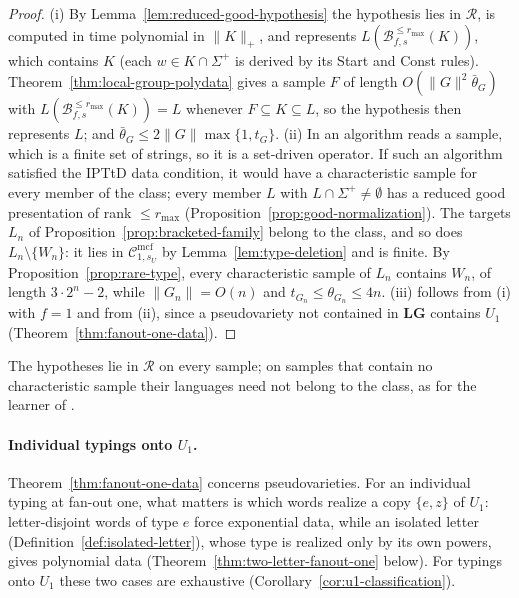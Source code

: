 \documentclass[11pt]{article}
\numberwithin{equation}{section}
\theoremstyle{plain}
\theoremstyle{definition}
\theoremstyle{remark}
\newcommand{\Cmcf}[2]{\mathcal{C}^{\mathrm{mcf}}_{#1,#2}}
\theoremstyle{plain}
\begin{document}
\begin{proof}
(i) By Lemma~\ref{lem:reduced-good-hypothesis} the hypothesis lies in
$\mathcal R$, is computed in time polynomial in $\|K\|_+$, and represents
$L(\mathcal B^{\le r_{\max}}_{f,s}(K))$, which contains $K$ (each $w\in K\cap\Sigma^+$
is derived by its Start and Const rules).
Theorem~\ref{thm:local-group-polydata} gives a sample $F$ of length
$O(\|G\|^2\bar\theta_G)$ with $L(\mathcal B^{\le r_{\max}}_{f,s}(K))=L$ whenever
$F\subseteq K\subseteq L$, so the hypothesis then represents $L$; and
$\bar\theta_G\le2\|G\|\max\{1,t_G\}$.
(ii) In \cite[Definition~2.12]{EyraudHeinzYoshinaka2016} an algorithm reads a
sample, which is a finite set of strings, so it is a set-driven operator.  If
such an algorithm satisfied the IPTtD data condition, it would have a
characteristic sample for every member of the class; every member $L$
with $L\cap\Sigma^+\ne\emptyset$ has a reduced good
presentation of rank $\le r_{\max}$ (Proposition~\ref{prop:good-normalization}).
The targets $L_n$ of Proposition~\ref{prop:bracketed-family} belong to the class,
and so does $L_n\setminus\{W_n\}$: it lies in $\Cmcf{1}{s_U}$ by
Lemma~\ref{lem:type-deletion} and is finite.  By
Proposition~\ref{prop:rare-type}, every characteristic sample of $L_n$ contains
$W_n$, of length $3\cdot2^n-2$, while $\|G_n\|=O(n)$ and $t_{G_n}\le\theta_{G_n}\le4n$.
(iii) follows from (i) with $f=1$ and from (ii), since a pseudovariety not
contained in $\mathbf{LG}$ contains $U_1$
(Theorem~\ref{thm:fanout-one-data}).
\end{proof}

The hypotheses lie in $\mathcal R$ on every sample; on samples that contain no
characteristic sample their languages need not belong to the class, as for the
learner of \cite{Yoshinaka2011}.

\paragraph{Individual typings onto $U_1$.}\label{subsec:u1-typings}
Theorem~\ref{thm:fanout-one-data} concerns pseudovarieties.  For an
individual typing at fan-out one, what matters is which words realize a copy
$\{e,z\}$ of $U_1$: letter-disjoint words of type $e$ force exponential data,
while an isolated letter (Definition~\ref{def:isolated-letter}), whose type is
realized only by its own powers, gives polynomial data
(Theorem~\ref{thm:two-letter-fanout-one} below).  For typings onto $U_1$
these two cases are exhaustive (Corollary~\ref{cor:u1-classification}).
\end{document}
